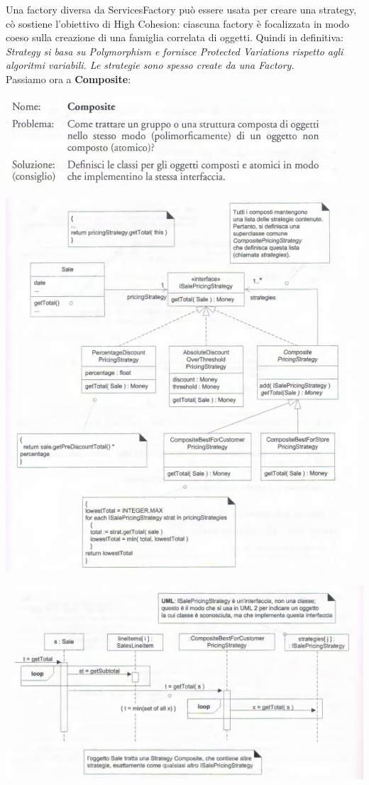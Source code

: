 \documentclass[a4paper,12pt, oneside]{book}
\begin{document}
Una factory diversa da ServicesFactory può essere usata per creare una strategy, cò sostiene l'obiettivo di High Cohesion: ciascuna factory è
focalizzata in modo coeso sulla creazione di una famiglia correlata di oggetti. Quindi in definitiva:
\textit{Strategy si basa su Polymorphism e fornisce Protected Variations rispetto agli algoritmi
variabili. Le strategie sono spesso create da una Factory.}\\
Passiamo ora a \textbf{Composite}:
\begin{center}
\includegraphics[scale = 0.7]{img/gof14.png}
\end{center}
\begin{center}
\includegraphics[scale = 0.7]{img/gof15.png}
\end{center}
\begin{center}
\includegraphics[scale = 0.7]{img/gof16.png}
\end{center}
\end{document}

